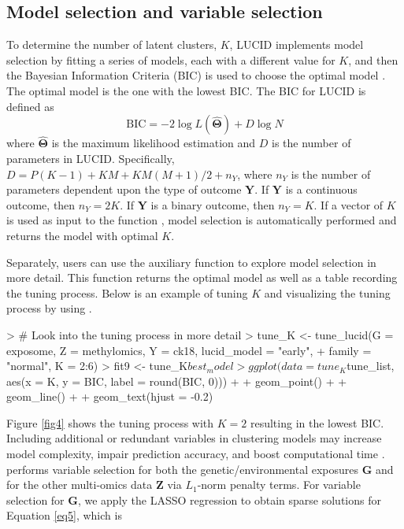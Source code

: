 \subsection{Model selection and variable selection} \label{sec3.3}
To determine the number of latent clusters, $K$, LUCID implements model selection by fitting a series of models, each with a different value for $K$, and then the Bayesian Information Criteria (BIC) is used to choose the optimal model \citep{fan2013tuning}. The optimal model is the one with the lowest BIC. The BIC for LUCID is defined as
\begin{equation}
    \text{BIC} = -2 \log L(\hat{\bm \Theta}) + D \log N
\end{equation}
where $\hat{\bm \Theta}$ is the maximum likelihood estimation and $D$ is the number of parameters in LUCID. Specifically, $D = P(K - 1) + KM + KM(M + 1)/2 + n_Y$, where $n_Y$ is the number of parameters dependent upon the type of outcome $\bm Y$. If $\bm Y$ is a continuous outcome, then $n_Y = 2K$. If $\bm Y$ is a binary outcome, then $n_Y = K$. If a vector of $K$ is used as input to the function , model selection is automatically performed and returns the model with optimal $K$.
Separately, users can use the auxiliary function  to explore model selection in more detail. This function returns the optimal model as well as a table recording the tuning process. Below is an example of tuning $K$ and visualizing the tuning process by using .
\begin{example}
> # Look into the tuning process in more detail
> tune_K <- tune_lucid(G = exposome, Z = methylomics, Y = ck18, lucid_model = "early",
+                      family = "normal", K = 2:6)
> fit9 <- tune_K$best_model
> ggplot(data = tune_K$tune_list, aes(x = K, y = BIC, label = round(BIC, 0))) +
+   geom_point() +
+   geom_line() +
+   geom_text(hjust = -0.2)
\end{example}
Figure \ref{fig4} shows the tuning process with $K = 2$ resulting in the lowest BIC.
Including additional or redundant variables in clustering models may increase model complexity, impair prediction accuracy, and boost computational time \citep{fop2018variable}.  performs variable selection for both the genetic/environmental exposures $\bm G$ and for the other multi-omics data $\bm Z$ via $L_1$-norm penalty terms. For variable selection for $\bm G$, we apply the LASSO regression to obtain sparse solutions for Equation \ref{eq5}, which is
